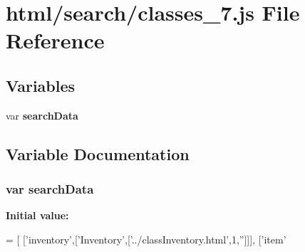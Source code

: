 \section{html/search/classes\-\_\-7.js File Reference}
\label{classes__7_8js}
\subsection*{Variables}
\begin{DoxyCompactItemize}
\item 
var {\bf search\-Data}
\end{DoxyCompactItemize}


\subsection{Variable Documentation}
\subsubsection[{search\-Data}]{\setlength{\rightskip}{0pt plus 5cm}var search\-Data}\label{classes__7_8js_ad01a7523f103d6242ef9b0451861231e}
{\bfseries Initial value\-:}
\begin{DoxyCode}
=
[
  [\textcolor{stringliteral}{'inventory'},[\textcolor{stringliteral}{'Inventory'},[\textcolor{stringliteral}{'../classInventory.html'},1,\textcolor{stringliteral}{''}]]],
  [\textcolor{stringliteral}{'item'}
\end{DoxyCode}
